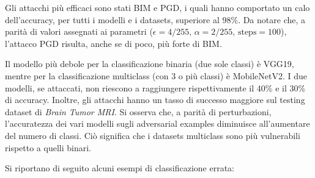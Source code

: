     Gli attacchi più efficaci sono stati BIM e PGD, i quali hanno comportato un calo dell'accuracy, per tutti i modelli e i datasets, superiore al $98\%$.
    Da notare che, a parità di valori assegnati ai parametri ($\epsilon=4/255,\, \alpha=2/255,\, \text{steps}=100$), l'attacco PGD risulta, anche se di poco, più forte di BIM.
    
    Il modello più debole per la classificazione binaria (due sole classi) è VGG19, mentre per la classificazione multiclass (con 3 o più classi) è MobileNetV2. I due modelli, se attaccati, non riescono a raggiungere rispettivamente il 40\% e il 30\% di accuracy. 
    Inoltre, gli attacchi hanno un tasso di successo maggiore sul testing dataset di \textit{Brain Tumor MRI}. Si osserva che, a parità di perturbazioni, l'accuratezza dei vari modelli sugli adversarial examples diminuisce all'aumentare del numero di classi. Ciò significa che i datasets multiclass sono più vulnerabili rispetto a quelli binari.
    
    \newpage
    Si riportano di seguito alcuni esempi di classificazione errata:
        \begin{figure}[!h]
            \centering
            \quad
            \caption{}
            \label{DenseNet121 wrong predictions}
        \end{figure}
    
